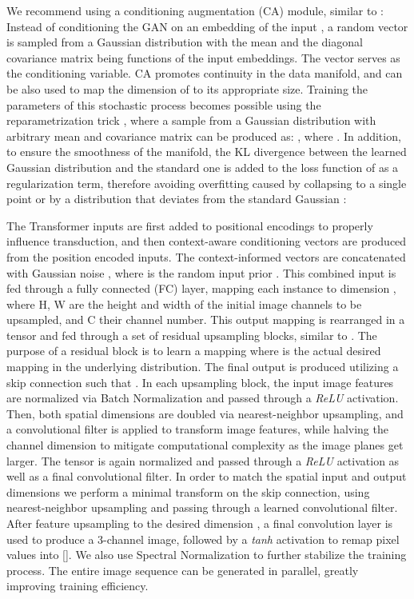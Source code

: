 \documentclass{article}
\begin{document}
We recommend using a conditioning augmentation (CA) module, similar to \cite{stackgan}: Instead of conditioning the GAN on an embedding of the input , a random vector  is sampled from a Gaussian distribution  with the mean  and the diagonal covariance matrix  being functions of the input embeddings. 
The vector  serves as the conditioning variable. CA promotes continuity in the data manifold, and can be also used to map the dimension of  to its appropriate size. Training the parameters of this stochastic process becomes possible using the reparametrization trick \cite{kingma2014autoencoding}, where a sample 
from a Gaussian distribution with arbitrary mean  
and covariance matrix   can be produced as: , where . In addition, 
to ensure the smoothness of the manifold, the KL divergence between the 
learned Gaussian distribution and the standard one is added to the loss function of  as a regularization term, therefore avoiding overfitting caused by collapsing to a  single point or by a distribution that deviates from the standard Gaussian \cite{stackgan}:

\begin{center}
    
\end{center}

The Transformer inputs  are first added to positional encodings to properly influence transduction, and then context-aware conditioning vectors  are produced from the position encoded inputs. The context-informed vectors  are concatenated with Gaussian noise , where  is the random input prior . This combined input is fed through a fully connected (FC) layer, mapping each instance to dimension , where H, W are the height and width of the initial image channels to be upsampled, and C their channel number. This output mapping is rearranged in a tensor  and fed through a set of residual upsampling blocks, similar to \cite{zhang2019sagan}. The purpose of a residual block \cite{he2016resnet} is to learn a mapping  where  is the actual desired mapping in the underlying distribution. The final output is produced utilizing a skip connection such that . 
In each upsampling block, the input image features \textbf{} are normalized via Batch Normalization \cite{ioffe2015batchnorm} and passed
through a \textit{ReLU} activation. Then, both spatial dimensions are doubled via nearest-neighbor upsampling,
and a convolutional filter is applied to transform image features, while halving the channel dimension to mitigate computational complexity as the image planes get larger. The tensor is again normalized and passed
through a \textit{ReLU} activation as well as a final convolutional filter. In order to match the spatial input and output dimensions we perform a minimal transform on the skip connection, using
nearest-neighbor upsampling and passing through a learned  convolutional filter.
After feature upsampling to the desired dimension , a final  convolution layer is used to
produce a 3-channel image, followed by a \textit{tanh} activation to remap pixel values into
[]. We also use Spectral Normalization to further stabilize the training process. The entire image sequence can be generated in parallel, greatly improving training efficiency. 
\end{document}
